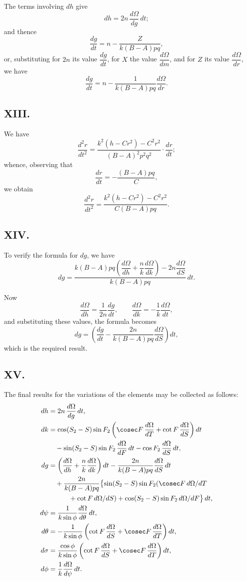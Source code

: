 \documentclass[11pt,a4paper]{book}
\begin{document}
{{The terms involving $dh$ give
\[
dh = 2n\,\frac{d\Omega}{dg}\,dt;
\]
and thence
\[
\frac{dg}{dt} = n - \frac{Z}{k(B-A)pq},
\]
or, substituting for $2n$ its value $\dfrac{dg}{dt}$, for $X$ the value $\dfrac{d\Omega}{dm}$, and for $Z$ its value $\dfrac{d\Omega}{dr}$, we have
\[
\frac{dg}{dt} = n - \frac{1}{k(B-A)pq}\frac{d\Omega}{dr}.
\]

\subsection*{XIII.}

We have
\[
\frac{d^2r}{dt^2} = \frac{k^2(h-Cr^2)-C^2r^2}{(B-A)^2p^2q^2}\cdot\frac{dr}{dt};
\]
whence, observing that
\[
\frac{dr}{dt} = -\frac{(B-A)pq}{C},
\]
we obtain
\[
\frac{d^2r}{dt^2} = \frac{k^2(h-Cr^2)-C^2r^2}{C(B-A)pq}.
\]

\subsection*{XIV.}

To verify the formula for $dg$, we have
\[
dg = \frac{k(B-A)pq\left(\dfrac{d\Omega}{dh} + \dfrac{n}{k}\dfrac{d\Omega}{dk}\right) - 2n\dfrac{d\Omega}{dS}}{k(B-A)pq}\,dt.
\]

Now
\[
\frac{d\Omega}{dh} = \frac{1}{2n}\frac{dg}{dt}, \qquad \frac{d\Omega}{dk} = -\frac{1}{k}\frac{d\Omega}{dt},
\]
and substituting these values, the formula becomes
\[
dg = \left(\frac{dg}{dt} - \frac{2n}{k(B-A)pq}\frac{d\Omega}{dS}\right)dt,
\]
which is the required result.

\subsection*{XV.}

The final results for the variations of the elements may be collected as follows:
\begin{align}
dh &= 2n\,\frac{d\Omega}{dg}\,dt, \\
dk &= \cos(S_2-S)\sin F_2\left(\cosec F\,\frac{d\Omega}{dT} + \cot F\,\frac{d\Omega}{dS}\right)dt \notag\\
&\quad - \sin(S_2-S)\sin F_2\,\frac{d\Omega}{dF}\,dt - \cos F_2\,\frac{d\Omega}{dS}\,dt, \\
dg &= \left(\frac{d\Omega}{dh} + \frac{n}{k}\frac{d\Omega}{dk}\right)dt - \frac{2n}{k(B-A)pq}\frac{d\Omega}{dS}\,dt \notag\\
&\quad + \frac{2n}{k(B-A)pq}\bigl\{\sin(S_2-S)\sin F_2(\cosec F\,d\Omega/dT \notag\\
&\quad\qquad + \cot F\,d\Omega/dS) + \cos(S_2-S)\sin F_2\,d\Omega/dF\bigr\}\,dt, \\
d\psi &= \frac{1}{k\sin\phi}\frac{d\Omega}{d\theta}\,dt, \\
d\theta &= -\frac{1}{k\sin\phi}\left(\cot F\,\frac{d\Omega}{dS} + \cosec F\,\frac{d\Omega}{dT}\right)dt, \\
d\sigma &= \frac{\cos\phi}{k\sin\phi}\left(\cot F\,\frac{d\Omega}{dS} + \cosec F\,\frac{d\Omega}{dT}\right)dt, \\
d\phi &= \frac{1}{k}\frac{d\Omega}{d\psi}\,dt.
\end{align}

}}
\end{document}
